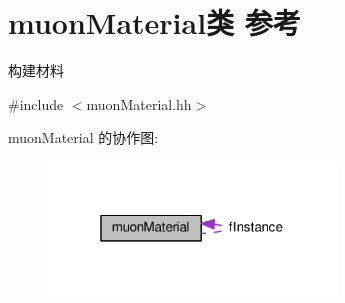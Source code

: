 \hypertarget{classmuonMaterial}{}\section{muon\+Material类 参考}
\label{classmuonMaterial}


构建材料  




{\ttfamily \#include $<$muon\+Material.\+hh$>$}



muon\+Material 的协作图\+:\nopagebreak
\begin{figure}[H]
\begin{center}
\leavevmode
\includegraphics[width=217pt]{classmuonMaterial__coll__graph}
\end{center}
\end{figure}
